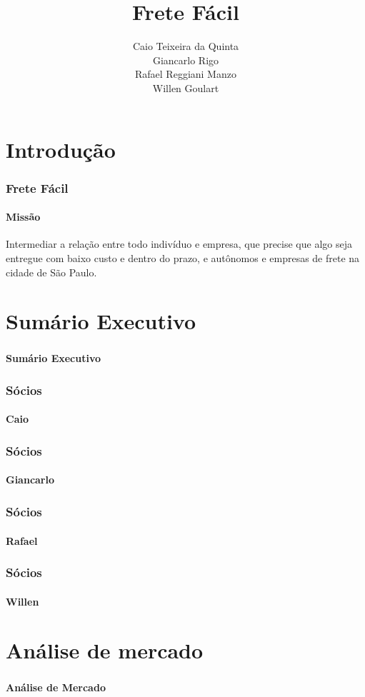 \documentclass{beamer}
\title{Frete Fácil}
\author{Caio Teixeira da Quinta\\
        Giancarlo Rigo\\
        Rafael Reggiani Manzo\\
        Willen Goulart}
\begin{document}
\maketitle

\section{Introdução}
\begin{frame}
  \frametitle{Frete Fácil}
  \framesubtitle{Missão}
  
  Intermediar a relação entre todo indivíduo e empresa, que precise que algo seja entregue com baixo custo e dentro do prazo, e autônomos e empresas de frete na cidade de São Paulo.

\end{frame}

\section{Sumário Executivo}
\begin{frame}
  \frametitle{}
  \framesubtitle{}

  \begin{center}
    {\huge\textbf{Sumário Executivo}}
  \end{center}
\end{frame}

\begin{frame}
  \frametitle{Sócios}
  \framesubtitle{Caio}

\end{frame}

\begin{frame}
  \frametitle{Sócios}
  \framesubtitle{Giancarlo}

\end{frame}

\begin{frame}
  \frametitle{Sócios}
  \framesubtitle{Rafael}

\end{frame}

\begin{frame}
  \frametitle{Sócios}
  \framesubtitle{Willen}

\end{frame}

\section{Análise de mercado}

\begin{frame}
  \frametitle{}
  \framesubtitle{}

  \begin{center}
    {\huge\textbf{Análise de Mercado}}
  \end{center}
\end{frame}
\end{document}
